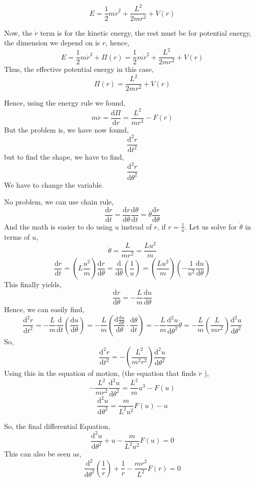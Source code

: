 \documentclass[12pt,a4paper]{article}
\begin{document}
\[ 
    E = \frac{1}{2} m \dot{r}^2 + \frac{L^2}{2mr^2} + V(r)
\]

Now, the $ \dot{r}$ term is for the kinetic energy, the rest must be for potential energy, the dimension we depend on is $r$, hence,
\[ 
    E = \frac{1}{2} m \dot{r} ^2 + \Pi(r)  = \frac{1}{2} m \dot{r}^2 + \frac{L^2}{2mr^2} + V(r)
\]
Thus, the effective potential energy in this case, 
\[ 
    \Pi(r) = \frac{L^2}{2mr^2} + V(r)
\]

Hence, using the energy rule we found,
\[ 
    m \ddot{ r } = \frac{\mathrm{d} \Pi}{\mathrm{d} r} = \frac{L^2}{mr^3} - F(r)
\]
But the problem is, we have now found, \[ 
\frac{\mathrm{d} ^2 r}{\mathrm{d} t^2}
\]but to find the shape, we have to find, 
\[ 
\frac{\mathrm{d} ^2r}{\mathrm{d} \theta^2}
\] We have to change the variable.

No problem, we can use chain rule, 
\[ 
\frac{\mathrm{d} r}{\mathrm{d} t} = \frac{\mathrm{d} r}{\mathrm{d} \theta} \frac{\mathrm{d} \theta}{\mathrm{d} t} = \dot{\theta } \frac{\mathrm{d} r}{\mathrm{d} \theta} 
\]
And the math is easier to do using $u$ instead of $r$, if $r = \frac{1}{u}$. Let us solve for $\dot{ \theta }$ in terms of $u$, 
\[ 
\dot{\theta} = \frac{L}{mr^2} = \frac{Lu^2}{m}
\]
\[ 
\frac{\mathrm{d} r}{\mathrm{d} t} =
\left( L \frac{u^2}{m} \right) \frac{\mathrm{d} r}{\mathrm{d} \theta}
=
\frac{\mathrm{d} }{\mathrm{d} \theta} \left( \frac{1}{u} \right) = \left( \frac{Lu^2}{m} \right) \left( - \frac{1}{u^2} \frac{\mathrm{d} u}{\mathrm{d} \theta} \right) 
\]
This finally yields,
\[ 
\frac{\mathrm{d} r}{\mathrm{d} \theta} = 
- \frac{L}{m} \frac{\mathrm{d} u}{\mathrm{d} \theta}
\] 
Hence, we can easily find,
\[ 
\frac{\mathrm{d} ^2 r}{\mathrm{d} t^2} = - \frac{L}{m} \frac{\mathrm{d} }{\mathrm{d} t}
\left( \frac{\mathrm{d} u}{\mathrm{d} \theta} \right) =
- \frac{L}{m} \left( \frac{\mathrm{d} 
\frac{\mathrm{d} u}{\mathrm{d} \theta}
}{\mathrm{d} \theta} \cdot  \frac{\mathrm{d} \theta}{\mathrm{d} t} \right) = - \frac{L}{m} \frac{\mathrm{d} ^2 u}{\mathrm{d} \theta^2 } \dot{\theta}
=
- \frac{L}{m} \left( \frac{L}{mr^2} \right) \frac{\mathrm{d} ^2 u}{\mathrm{d} \theta^2}
\] 
So,
\[ 
\frac{\mathrm{d} ^2 r}{\mathrm{d} t^2} =
- \left( \frac{L^2}{m^2 r^2} \right) \frac{\mathrm{d} ^2 u}{\mathrm{d} \theta ^2}
\]
Using this in the equation of motion, (the equation that finds $\ddot{ r }$ ), 
\[ 
    - \frac{L^2}{m r^2} \frac{\mathrm{d}^2 u}{\mathrm{d} \theta^2} = \frac{L^2}{m}u^3 -F(u)
\]
\[ 
    \frac{\mathrm{d} ^2 u}{\mathrm{d} \theta^2} = \frac{m}{L^2 u^2} F(u) - u
\]

So, the final differential Equation,
\[ 
\boxed{ 
    \frac{\mathrm{d} ^2 u}{\mathrm{d} \theta^2} + u - \frac{m}{L^2u^2}F(u) = 0
}
\]  
This can also be seen as,
\[
    \boxed{ \frac{\mathrm{d} ^2}{\mathrm{d} \theta^2} \left(\frac{1}{r} \right) + \frac{1}{r} - \frac{mr^2}{L^2 } F\left( r \right) =0}
\]
\end{document}

